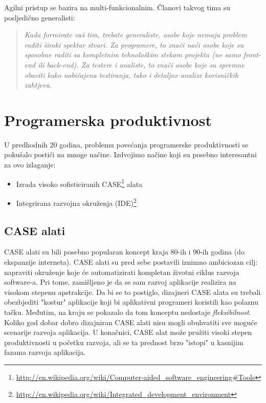 \documentclass[times, utf8, seminar]{fit}
\begin{document}
Agilni pristup se bazira na multi-funkcionalnim. Članovi takvog tima su posljedično generalisti\citep[str. 19]{agilesamurai}:

\begin{quote}
\emph{Kada formirate vaš tim, trebate generaliste, osobe koje nemaju problem raditi široki spektar stvari. Za programere, to znači naći osobe koje su sposobne raditi sa kompletnim tehnološkim stekom projekta (ne samo front-end ili back-end). Za testere i analiste, to znači osobe koje su spremne obaviti kako uobičajena testiranja, tako i detaljne analize korisničkih zahtjeva.}
\end{quote}

\section{Programerska produktivnost}

U predhodnih 20 godina, problemu povećanja programerske produktivnosti se pokušalo postići na mnoge načine. Izdvojimo načine koji su posebno interesantni za ovo izlaganje:

\begin{itemize}
  \item Izrada visoko sofisticiranih CASE\footnote{\url{http://en.wikipedia.org/wiki/Computer-aided_software_engineering#Tools}} alata
  \item Integrirana razvojna okruženja (IDE)\footnote{\url{http://en.wikipedia.org/wiki/Integrated_development_environment}} 
\end{itemize}

\subsection{CASE alati}

CASE alati su bili posebno popularan koncept kraja 80-ih i 90-ih godina (do ekspanzije interneta). CASE alati su pred sebe postavili iznimno ambiciozan cilj: napraviti okruženje koje će automatizirati kompletan životni ciklus razvoja software-a. Pri tome, zamišljeno je da se sam razvoj aplikacije realizira na visokom stepenu apstrakcije. Da bi se to postiglo, dizajneri CASE alata su trebali obezbjediti "kostur" aplikacije koji bi aplikativni programeri koristili kao polaznu tačku. Međutim, na kraju se pokazalo da tom konceptu nedostaje \emph{fleksibilnost}. Koliko god dobar dobro dizajniran CASE alati nisu mogli obuhvatiti sve moguće scenarije razvoja aplikacija. U konačnici, CASE alat može pružiti visoki stepen produktivnosti u početku razvoja, ali se ta prednost brzo "istopi" u kasnijim fazama razvoja aplikacija. 
\end{document}
